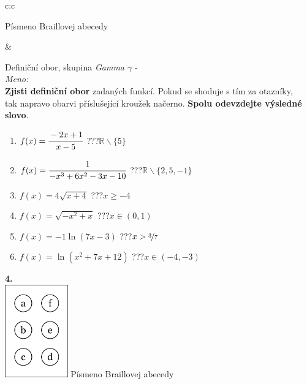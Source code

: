 \documentclass[10pt]{report}
\begin{document}
\begin{tabular}{c:c}
\begin{minipage}[c][99mm][t]{0.49\linewidth}
\begin{center}
\begin{minipage}{0.20\linewidth}
\begin{center}
{\small Písmeno Braillovej abecedy}
\end{center}
\end{minipage}
\end{center}
\end{minipage}
&
\begin{minipage}[c][99mm][t]{0.49\linewidth}
\begin{center}
\vspace{7mm}
{\huge Definiční obor, skupina \textit{Gamma $\gamma$} -}\\[4.5mm]
\textit{Meno:}\phantom{xxxxxxxxxxxxxxxxxxxxxxxxxxxxxxxxxxxxxxxxxxxxxxxxxxxxxxxxxxxxxxxxx}\\[3.5mm]
\textbf{Zjisti definiční obor} zadaných funkcí. Pokud se shoduje s tím za otazníky,\\tak napravo obarvi příslušející kroužek načerno. \textbf{Spolu odevzdejte výsledné slovo}.\\[3mm]
\begin{minipage}{0.77\linewidth}
\begin{center}
\begin{varwidth}{\textwidth}
\begin{enumerate}
\normalsize
\item $f(x)=\cfrac{-2x+1}{x-5}$\quad \dotfill\; ???\;\dotfill \quad $\mathbb{R}\smallsetminus\{5\}$
\item $f(x)=\cfrac{1}{-x^3+6x^2-3x-10}$\quad \dotfill\; ???\;\dotfill \quad $\mathbb{R}\smallsetminus\{2,5,-1\}$
\item $f(x)=4\sqrt{x+4}$\quad \dotfill\; ???\;\dotfill \quad $x\geq-4$
\item $f(x)=\sqrt{-x^2+x}$\quad \dotfill\; ???\;\dotfill \quad $x\in(0 , 1)$
\item $f(x)=-1\ln{(7x-3)}$\quad \dotfill\; ???\;\dotfill \quad $x>\nicefrac{3}{7}$
\item $f(x)=\ln{(x^2+7x+12)}$\quad \dotfill\; ???\;\dotfill \quad $x\in(-4 , -3)$
\end{enumerate}
\end{varwidth}
\end{center}
\end{minipage}
\begin{minipage}{0.20\linewidth}
\begin{center}
{\Huge\bfseries 4.} \\[2mm]
\includegraphics[height=40mm]{../images/braille.png}
{\small Písmeno Braillovej abecedy}
\end{center}
\end{minipage}
\end{center}
\end{minipage}
%
\end{tabular}
\end{document}
